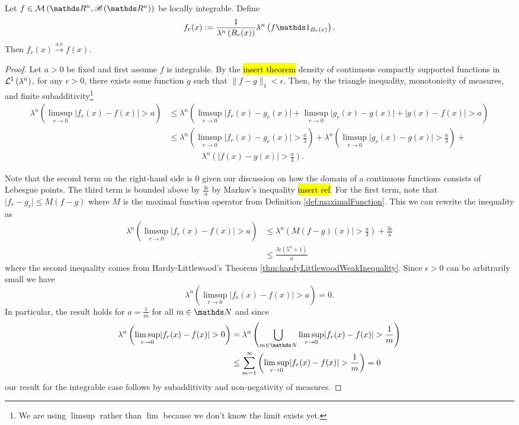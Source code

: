 \begin{lem}
	\label{lem:lebesgueDifferentiation}
	Let $f \in \mathcal{M}\left(\R^n , \borel \left(\R^n\right)\right)$ be locally integrable. Define
	\[
	f_r(x) := \frac{1}{\lambda^n \left(B_r(x)\right) } \lambda^n \left(  f \indicate_{B_r(x)} \right).
	\]
	Then $f_r(x) \stackrel{\text{a.e}}{\to} f(x)$.
\end{lem}
\begin{proof}
	Let $a > 0$ be fixed and first assume $f$ is integrable. By the \hl{insert theorem} density of continuous compactly supported functions in $\mathcal{L}^{1}\left(\lambda^n\right)$, for any $\epsilon > 0$, there exists some function $g$ such that $\lVert f - g \rVert_1 < \epsilon$. Then, by the triangle inequality, monotonicity of measures, and finite subadditivity\footnote{We are using $\limsup$ rather than $\lim$ because we don't know the limit exists yet.}
	\begin{align*}
		\lambda^n\left(\limsup_{r\to 0}\lvert f_r(x) - f(x) \rvert > a\right) &\leq \lambda^n\left(\limsup_{r\to 0}\lvert f_r(x) - g_r(x) \rvert +  \limsup_{r\to 0}\lvert g_r(x) - g(x) \rvert + \lvert g(x) - f(x) \rvert > a\right) \\
		&\leq \lambda^n \left(\limsup_{r\to 0} \lvert f_r(x) - g_r(x) \rvert > \frac{a}{3}\right) + \lambda^n\left(\limsup_{r\to 0} \lvert g_r(x) - g(x) \rvert > \frac{a}{3}\right) + \\ & \hspace{4em}\lambda^n\left(\lvert f(x) - g(x) \rvert > \frac{a}{3}\right).
	\end{align*}
	
	Note that the second term on the right-hand side is 0 given our discussion on how the domain of a continuous functions consists of Lebesgue points. The third term is bounded above by $\frac{3\epsilon}{a}$ by Markov's inequality \hl{insert ref}. For the first term, note that $\lvert f_r - g_r \rvert \leq M\left(f-g\right)$ where $M$ is the maximal function operator from Definition \ref{def:maximalFunction}. This we can rewrite the inequality as 
	\begin{align*}
		\lambda^n\left(\limsup_{r\to 0}\lvert f_r(x) - f(x) \rvert > a\right) &\leq 	\lambda^n\left(M(f-g)(x) \rvert > \frac{a}{3}\right) + \frac{3\epsilon}{a} \\
		&\leq \frac{3\epsilon\left(5^n + 1\right)}{a}
	\end{align*}
	where the second inequality comes from Hardy-Littlewood's Theorem \ref{thm:hardyLittlewoodWeakInequality}. Since $\epsilon > 0$ can be arbitrarily small we have 
	\[
	\lambda^n\left(\limsup_{r\to 0}\lvert f_r(x) - f(x) \rvert > a\right) = 0.
	\]
	In particular, the result holds for $a = \frac{1}{m}$ for all $m \in \N$ and since
	\begin{align*}
		\lambda^n\left(\limsup_{r\to 0}\lvert f_r(x) - f(x) \rvert > 0\right) &= \lambda^n\left(\bigcup_{m\in\N}\limsup_{r\to 0}\lvert f_r(x) - f(x) \rvert > \frac{1}{m}\right) \\
		&\leq \sum_{m=1}^\infty \left(\limsup_{r\to 0}\lvert f_r(x) - f(x) \rvert > \frac{1}{m}\right) = 0
	\end{align*}
	our result for the integrable case follows by subadditivity and non-negativity of measures.
	

\end{proof}
